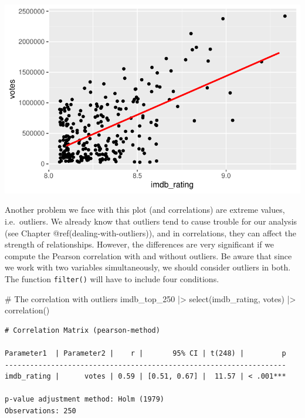 \documentclass[
  letterpaper,
]{krantz}
\makeatletter
\newenvironment{Shaded}{\begin{snugshade}}{\end{snugshade}}
\newcommand{\CommentTok}[1]{\textcolor[rgb]{0.37,0.37,0.37}{#1}}
\newcommand{\FunctionTok}[1]{\textcolor[rgb]{0.28,0.35,0.67}{#1}}
\newcommand{\NormalTok}[1]{\textcolor[rgb]{0.00,0.23,0.31}{#1}}
\newcommand{\SpecialCharTok}[1]{\textcolor[rgb]{0.37,0.37,0.37}{#1}}
\newenvironment{kframe}{%
\medskip{}
\setlength{\fboxsep}{.8em}
 \def\at@end@of@kframe{}%
 \ifinner\ifhmode%
  \def\at@end@of@kframe{\end{minipage}}%
  \begin{minipage}{\columnwidth}%
 \fi\fi%
 \def\FrameCommand##1{\hskip\@totalleftmargin \hskip-\fboxsep
 \colorbox{shadecolor}{##1}\hskip-\fboxsep
     \hskip-\linewidth \hskip-\@totalleftmargin \hskip\columnwidth}%
 \MakeFramed {\advance\hsize-\width
   \@totalleftmargin\z@ \linewidth\hsize
   \@setminipage}}%
 {\par\unskip\endMakeFramed%
 \at@end@of@kframe}
\renewenvironment{Shaded}{\begin{kframe}}{\end{kframe}}
\makeatother
\begin{document}
\includegraphics{10_correlations_files/figure-pdf/ratings-vs-votes-regression-line-1.pdf}

Another problem we face with this plot (and correlations) are extreme
values, i.e.~outliers. We already know that outliers tend to cause
trouble for our analysis (see Chapter @ref(dealing-with-outliers)), and
in correlations, they can affect the strength of relationships. However,
the differences are very significant if we compute the Pearson
correlation with and without outliers. Be aware that since we work with
two variables simultaneously, we should consider outliers in both. The
function \texttt{filter()} will have to include four conditions.

\begin{Shaded}
\begin{Highlighting}[]
\CommentTok{\# The correlation with outliers}
\NormalTok{imdb\_top\_250 }\SpecialCharTok{|\textgreater{}}
  \FunctionTok{select}\NormalTok{(imdb\_rating, votes) }\SpecialCharTok{|\textgreater{}}
  \FunctionTok{correlation}\NormalTok{()}
\end{Highlighting}
\end{Shaded}

\begin{verbatim}
# Correlation Matrix (pearson-method)

Parameter1  | Parameter2 |    r |       95% CI | t(248) |         p
-------------------------------------------------------------------
imdb_rating |      votes | 0.59 | [0.51, 0.67] |  11.57 | < .001***

p-value adjustment method: Holm (1979)
Observations: 250
\end{verbatim}
\end{document}
